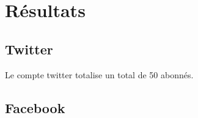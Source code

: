 \section{Résultats}

\subsection{Twitter}

Le compte twitter totalise un total de 50 abonnés.


\subsection{Facebook}

